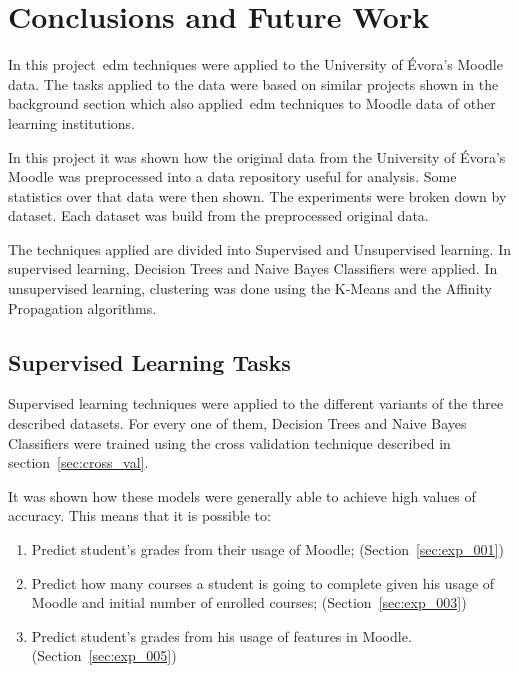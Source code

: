 \chapter{Conclusions and Future Work}
\label{sec:final}

In this project~\gls{edm} techniques were applied to the University of Évora's
Moodle data. The tasks applied to the data were based on similar projects shown
in the background section which also applied~\gls{edm} techniques to Moodle
data of other learning institutions.

In this project it was shown how the original data from the University of
Évora's Moodle was preprocessed into a data repository useful for analysis.
Some statistics over that data were then shown. The experiments were broken
down by dataset. Each dataset was build from the preprocessed original data.

The techniques applied are divided into Supervised and Unsupervised learning.
In supervised learning, Decision Trees and Naive Bayes Classifiers were
applied. In unsupervised learning, clustering was done using the K-Means and
the Affinity Propagation algorithms.

\section{Supervised Learning Tasks}

Supervised learning techniques were applied to the different variants of the
three described datasets. For every one of them, Decision Trees and Naive Bayes
Classifiers were trained using the cross validation technique described in
section~\ref{sec:cross_val}.

It was shown how these models were generally able to achieve high values of
accuracy. This means that it is possible to:

\begin{enumerate}
    \item Predict student's grades from their usage of Moodle;
        (Section~\ref{sec:exp_001})
    \item Predict how many courses a student is going to complete given his
        usage of Moodle and initial number of enrolled courses;
        (Section~\ref{sec:exp_003})
    \item Predict student's grades from his usage of features in Moodle.
        (Section~\ref{sec:exp_005})
\end{enumerate}

